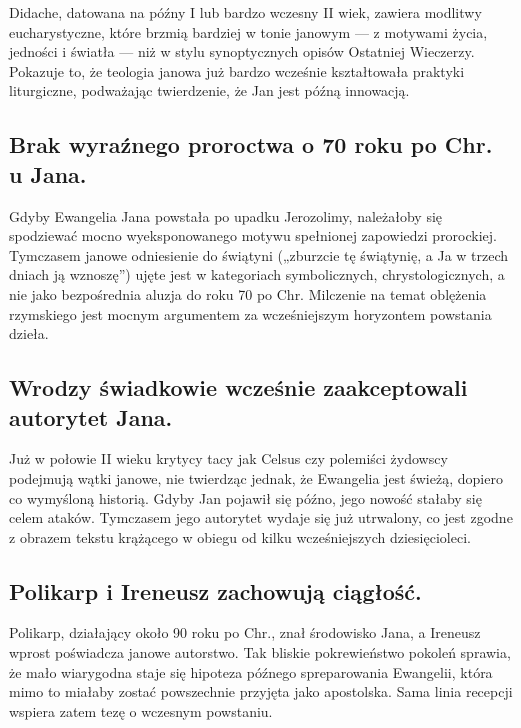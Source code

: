 Didache, datowana na późny I lub bardzo wczesny II wiek, zawiera modlitwy eucharystyczne, które brzmią bardziej w tonie janowym --- z motywami życia, jedności i światła --- niż w stylu synoptycznych opisów Ostatniej Wieczerzy.
Pokazuje to, że teologia janowa już bardzo wcześnie kształtowała praktyki liturgiczne, podważając twierdzenie, że Jan jest późną innowacją.

\subsection{Brak wyraźnego proroctwa o 70 roku po Chr. u Jana.}

\label{subsec:absence-of-explicit-70ad-prophecy-in-john.}

Gdyby Ewangelia Jana powstała po upadku Jerozolimy, należałoby się spodziewać mocno wyeksponowanego motywu spełnionej zapowiedzi prorockiej.
Tymczasem janowe odniesienie do świątyni („zburzcie tę świątynię, a Ja w trzech dniach ją wznoszę”) ujęte jest w kategoriach symbolicznych, chrystologicznych, a nie jako bezpośrednia aluzja do roku 70 po Chr.
Milczenie na temat oblężenia rzymskiego jest mocnym argumentem za wcześniejszym horyzontem powstania dzieła.

\subsection{Wrodzy świadkowie wcześnie zaakceptowali autorytet Jana.}\label{subsec:hostile-witnesses-accepted-johns-authority-early.}

Już w połowie II wieku krytycy tacy jak Celsus czy polemiści żydowscy podejmują wątki janowe, nie twierdząc jednak, że Ewangelia jest świeżą, dopiero co wymyśloną historią.
Gdyby Jan pojawił się późno, jego nowość stałaby się celem ataków.
Tymczasem jego autorytet wydaje się już utrwalony, co jest zgodne z obrazem tekstu krążącego w obiegu od kilku wcześniejszych dziesięcioleci.

\subsection{Polikarp i Ireneusz zachowują ciągłość.}\label{subsec:polycarp-and-irenaeus-preserve-continuity.}

Polikarp, działający około 90 roku po Chr., znał środowisko Jana, a Ireneusz wprost poświadcza janowe autorstwo.
Tak bliskie pokrewieństwo pokoleń sprawia, że mało wiarygodna staje się hipoteza późnego spreparowania Ewangelii, która mimo to miałaby zostać powszechnie przyjęta jako apostolska.
Sama linia recepcji wspiera zatem tezę o wczesnym powstaniu.

